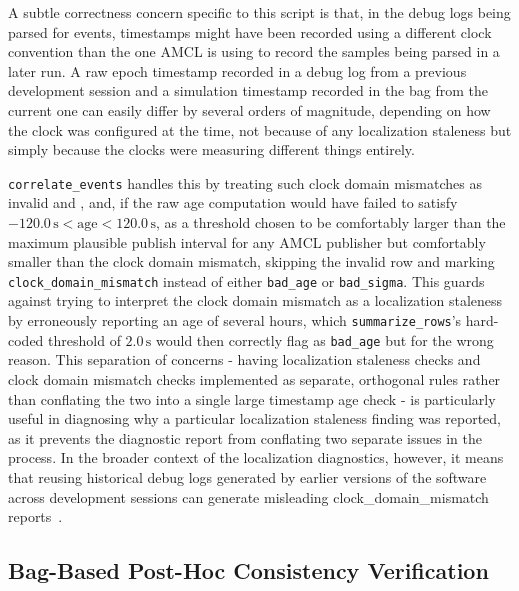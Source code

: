 A subtle correctness concern specific to this script is that, in the debug logs being parsed for events, timestamps might have been recorded using a different clock convention than the one AMCL is using to record the samples being parsed in a later run. A raw epoch timestamp recorded in a debug log from a previous development session and a simulation timestamp recorded in the bag from the current one can easily differ by several orders of magnitude, depending on how the clock was configured at the time, not because of any localization staleness but simply because the clocks were measuring different things entirely.

\texttt{correlate\_events} handles this by treating such clock domain mismatches as invalid and , and, if the raw age computation would have failed to satisfy $-120.0\,\text{s} < \text{age} < 120.0\,\text{s}$, as a threshold chosen to be comfortably larger than the maximum plausible publish interval for any AMCL publisher but comfortably smaller than the clock domain mismatch, skipping the invalid row and marking \texttt{clock\_domain\_mismatch} instead of either \texttt{bad\_age} or \texttt{bad\_sigma}. This guards against trying to interpret the clock domain mismatch as a localization staleness by erroneously reporting an age of several hours, which \texttt{summarize\_rows}'s hard-coded threshold of $2.0\,\text{s}$ would then correctly flag as \texttt{bad\_age} but for the wrong reason. This separation of concerns - having localization staleness checks and clock domain mismatch checks implemented as separate, orthogonal rules rather than conflating the two into a single large timestamp age check - is particularly useful in diagnosing why a particular localization staleness finding was reported, as it prevents the diagnostic report from conflating two separate issues in the process. In the broader context of the localization diagnostics, however, it means that reusing historical debug logs generated by earlier versions of the software across development sessions can generate misleading clock\_domain\_mismatch reports~\cite{kudla2026system}.

\subsection{Bag-Based Post-Hoc Consistency Verification}

